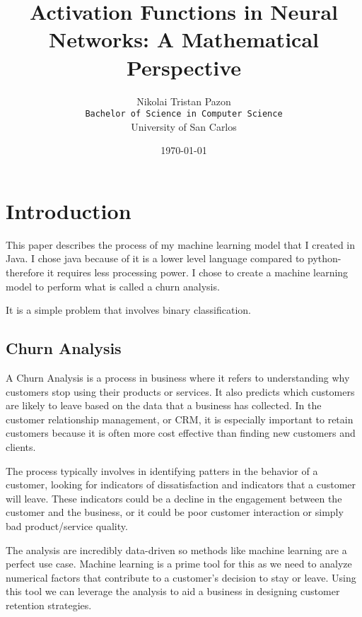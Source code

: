 \documentclass[12pt,a4paper]{article}
\title{Activation Functions in Neural Networks: A Mathematical Perspective}
\author{Nikolai Tristan Pazon\\
        \texttt{Bachelor of Science in Computer Science}\\
        University of San Carlos}
\date{\today}
\begin{document}
\maketitle

\begin{abstract}

\end{abstract}

\newpage

\section{Introduction}

This paper describes the process of my machine learning model that I created in Java. I chose java 
because of it is a lower level language compared to python- therefore it requires less processing power.
I chose to create a machine learning model to perform what is called a churn analysis. 

It is a simple problem that involves binary classification. 

\subsection{Churn Analysis}

A Churn Analysis is a process in business where it refers to understanding why customers stop using their products or services.
It also predicts which customers are likely to leave based on the data that a business has collected. In the customer relationship management,
or CRM, it is especially important to retain customers because it is often more cost effective than finding new customers and clients.
\cite{Burez2007}

The process typically involves in identifying patters in the behavior of a customer, looking for indicators of dissatisfaction and 
indicators that a customer will leave. These indicators could be a decline in the engagement between the customer and the business,
or it could be poor customer interaction or simply bad product/service quality.
\cite{Lalwani2021, Amin2019, Makhtar2018, Umayaparvathi2016}

The analysis are incredibly data-driven so methods like machine learning are a perfect use case. Machine learning is a prime tool for this as
we need to analyze numerical factors that contribute to a customer's decision to stay or leave. Using this tool we can leverage the analysis
to aid a business in designing customer retention strategies.
\cite{Maan2023, Lu2014}
\end{document}
